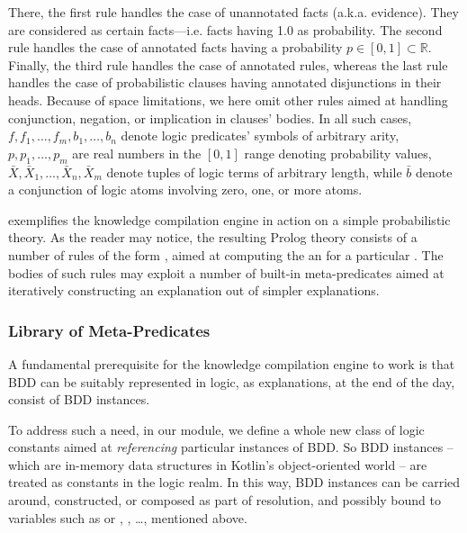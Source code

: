 \documentclass[12pt,a4paper,openright,twoside]{book}
\begin{document}
\noindent
There, the first rule handles the case of unannotated facts (a.k.a. evidence).
%
They are considered as certain facts---i.e. facts having 1.0 as probability.
%
The second rule handles the case of annotated facts having a probability $p \in [0, 1] \subset \mathbb{R}$.
%
Finally, the third rule handles the case of annotated rules, whereas the last rule handles the case of probabilistic clauses having annotated disjunctions in their heads.
%
Because of space limitations, we here omit other rules aimed at handling conjunction, negation, or implication in clauses' bodies.
%
In all such cases, $f, f_1, \ldots, f_m, b_1, \ldots, b_n$ denote logic predicates' symbols of arbitrary arity, $p, p_1, \ldots, p_m$ are real numbers in the $[0, 1]$ range denoting probability values, $\bar{X}, \bar{X}_1, \ldots, \bar{X}_n, \bar{X}_m$ denote tuples of logic terms of arbitrary length, while $\bar{b}$ denote a conjunction of logic atoms involving zero, one, or more atoms.

 exemplifies the knowledge compilation engine in action on a simple probabilistic theory.
%
As the reader may notice, the resulting Prolog theory consists of a number of rules of the form , aimed at computing the an  for a particular .
%
The bodies of such rules may exploit a number of built-in meta-predicates aimed at iteratively constructing an explanation out of simpler explanations.


\subsubsection{Library of Meta-Predicates}

A fundamental prerequisite for the knowledge compilation engine to work is that BDD can be suitably represented in logic, as explanations, at the end of the day, consist of BDD instances.

To address such a need, in our  module, we define a whole new class of logic constants aimed at \emph{referencing} particular instances of BDD.
%
So BDD instances -- which are in-memory data structures in Kotlin's object-oriented world -- are treated as constants in the logic realm.
%
In this way, BDD instances can be carried around, constructed, or composed as part of resolution, and possibly bound to variables such as  or , , \ldots,  mentioned above.
\end{document}
